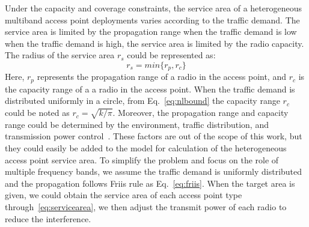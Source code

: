 

Under the capacity and coverage constraints, the service area of a heterogeneous multiband access point deployments
varies according to the traffic demand. The service area is limited by the propagation range when the traffic 
demand is low  when the traffic demand is high, the service area is limited by the radio capacity.
The radius of the service area $r_s$ could be represented as:
\begin{equation}
\label{eq:servicearea}
r_s=min\{r_p,r_c\}
\end{equation}
Here, $r_p$ represents the propagation range of a radio in the access point, and $r_c$ is the capacity range of 
a a radio in the access point. When the traffic demand is distributed uniformly in a circle, from 
Eq.~\ref{eq:nlbound} the capacity range $r_c$ could be noted as $r_c=\sqrt{k/\pi}$. Moreover,
the propagation range and capacity range could be determined by the environment, traffic distribution, and
transmission power control~\cite{robinson2010deploying}. These factors are out of the scope of this work, but they could
easily be added to the model for calculation of the heterogeneous access point service area. To simplify the 
problem and focus on the role of multiple frequency bands, we assume the traffic demand is uniformly distributed and the propagation 
follows Friis rule as Eq.~\ref{eq:friis}. When the target area is given, we could obtain the service area of
each access point type through~\ref{eq:servicearea}, we then adjust the transmit power of each radio
to reduce the interference.

